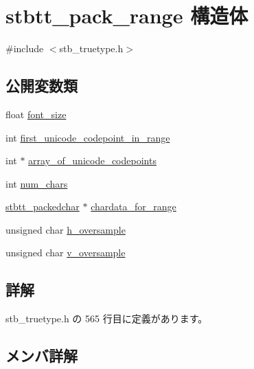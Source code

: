 \hypertarget{structstbtt__pack__range}{}\section{stbtt\+\_\+pack\+\_\+range 構造体}
\label{structstbtt__pack__range}


{\ttfamily \#include $<$stb\+\_\+truetype.\+h$>$}

\subsection*{公開変数類}
\begin{DoxyCompactItemize}
\item 
float \mbox{\hyperlink{structstbtt__pack__range_a296916dc971e5e7627822fe98dc42828}{font\+\_\+size}}
\item 
int \mbox{\hyperlink{structstbtt__pack__range_a3b414cbee1e164c29dd138e0ae3d5759}{first\+\_\+unicode\+\_\+codepoint\+\_\+in\+\_\+range}}
\item 
int $\ast$ \mbox{\hyperlink{structstbtt__pack__range_a1567aa5455e1251529a91b46261368cf}{array\+\_\+of\+\_\+unicode\+\_\+codepoints}}
\item 
int \mbox{\hyperlink{structstbtt__pack__range_a046d65b6ffb65fb998d471ba098e2e23}{num\+\_\+chars}}
\item 
\mbox{\hyperlink{structstbtt__packedchar}{stbtt\+\_\+packedchar}} $\ast$ \mbox{\hyperlink{structstbtt__pack__range_aa8f7ddd637ed341ea39b08466fab9284}{chardata\+\_\+for\+\_\+range}}
\item 
unsigned char \mbox{\hyperlink{structstbtt__pack__range_a7a642139ce446c58fde5c48553bcf008}{h\+\_\+oversample}}
\item 
unsigned char \mbox{\hyperlink{structstbtt__pack__range_a6288f14006e257544db3d015c32b4113}{v\+\_\+oversample}}
\end{DoxyCompactItemize}


\subsection{詳解}


 stb\+\_\+truetype.\+h の 565 行目に定義があります。



\subsection{メンバ詳解}
\mbox{\label{structstbtt__pack__range_a1567aa5455e1251529a91b46261368cf}} 
